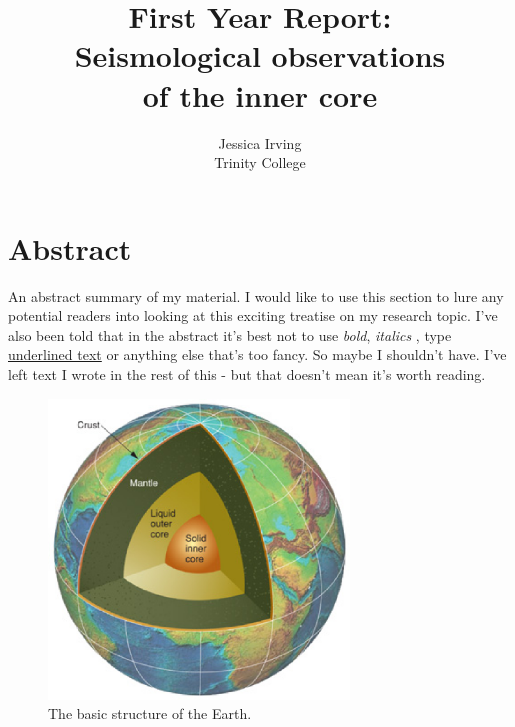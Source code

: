\documentclass[11pt,a4paper,oneside,titlepage]{article}
\title{\Huge First Year Report: \\
Seismological observations \\
of the inner core }
\author{ Jessica Irving \\
         Trinity College}
\date{}
\begin{document}
\maketitle

\tableofcontents

\newpage



\section{Abstract}

An abstract summary of my material. I would like to use this section to lure any potential readers into looking at this exciting treatise on my research topic. I've also been told that in the abstract it's best not to use \emph{bold}, \textit{italics} ,  type \underline{underlined text} or anything else that's too fancy. So maybe I shouldn't have. I've left text I wrote in the rest of this - but that doesn't mean it's worth reading.


\begin{figure}[bth]
\begin{center}
\includegraphics[width=8cm]{fried.eps}
\caption{\small The basic structure of the Earth.}
\label{fig:Earth}
\end{center}
\end{figure}
\end{document}
